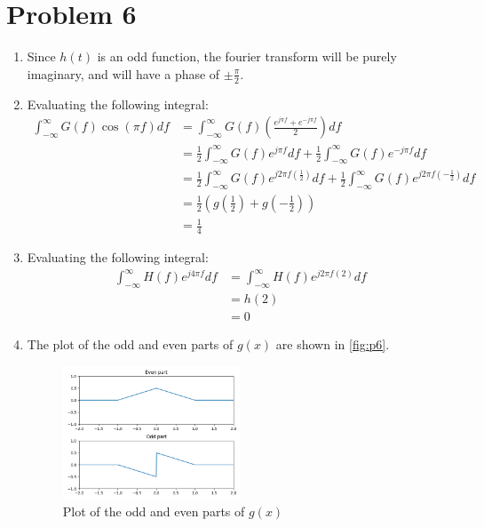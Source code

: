 \documentclass{article}
\begin{document}
\section{Problem 6}

\begin{enumerate}[label=6.\arabic*]
    \item Since $h(t)$ is an odd function, the fourier transform will be purely imaginary, and will have a phase of $\pm \frac{\pi}{2}$.
    \item Evaluating the following integral:
    \begin{align*}
        \int_{-\infty}^{\infty} G(f)\cos(\pi f)df &= \int_{-\infty}^{\infty} G(f)\left(\frac{e^{j\pi f} + e^{-j\pi f}}{2}\right)df \\
        &= \frac{1}{2}\int_{-\infty}^{\infty} G(f)e^{j\pi f}df + \frac{1}{2}\int_{-\infty}^{\infty} G(f)e^{-j\pi f}df \\
        &= \frac{1}{2}\int_{-\infty}^{\infty} G(f)e^{j2\pi f (\frac{1}{2})}df + \frac{1}{2}\int_{-\infty}^{\infty} G(f)e^{j2\pi f (-\frac{1}{2})}df \\
        &=\frac{1}{2}\left( g\left(\frac{1}{2}\right) + g\left(-\frac{1}{2}\right) \right) \\
        &= \frac{1}{4}
    \end{align*}
    \item Evaluating the following integral:
    \begin{align*}
        \int_{-\infty}^{\infty} H(f)e^{j4\pi f} df &= \int_{-\infty}^{\infty} H(f)e^{j2\pi f (2)} df \\
        &= h(2) \\
        &= 0
    \end{align*}

    \item The plot of the odd and even parts of $g(x)$ are shown in \autoref{fig:p6}.

    \begin{figure}[ht!]
        \centering
        \includegraphics[width=0.5\textwidth]{p6.png}
        \caption{Plot of the odd and even parts of $g(x)$}
        \label{fig:p6}
    \end{figure}


\end{enumerate}
\end{document}
